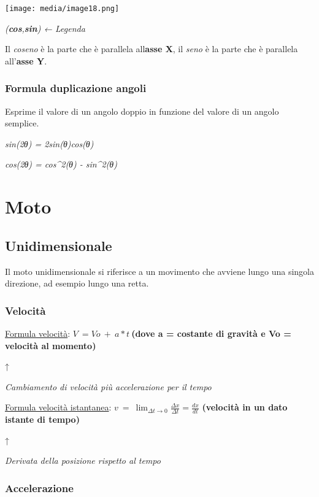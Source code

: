 \texttt{[image: media/image18.png]}

\emph{(\textbf{cos},\textbf{sin}) ← Legenda}

Il \emph{coseno} è la parte che è parallela
all\textquotesingle{}\textbf{asse X}, il \emph{seno} è la parte che è
parallela all'\textbf{asse Y}.

\subsubsection{Formula duplicazione
angoli}\label{formula-duplicazione-angoli}

Esprime il valore di un angolo doppio in funzione del valore di un
angolo semplice.

\emph{sin(2θ) = 2sin(θ)cos(θ)}

\emph{cos(2θ) = cos\^{}2(θ) - sin\^{}2(θ)}

\section{Moto}\label{moto}

\subsection{Unidimensionale}\label{unidimensionale}

Il moto unidimensionale si riferisce a un movimento che avviene lungo
una singola direzione, ad esempio lungo una retta.

\subsubsection{Velocità}\label{velocituxe0}

\ul{Formula velocità}: \(V\  = Vo\  + \ a*t\ \)\textbf{(dove a =
costante di gravità e Vo = velocità al momento)}

↑

\emph{Cambiamento di velocità più accelerazione per il tempo}

\ul{Formula velocità istantanea}:
\(v\  = \ \lim_{\Delta t \rightarrow 0}\frac{\Delta x}{\Delta t} = \frac{dx}{dt}\)
\textbf{(velocità in un dato istante di tempo)}

↑

\emph{Derivata della posizione rispetto al tempo}

\subsubsection{Accelerazione}\label{accelerazione}

